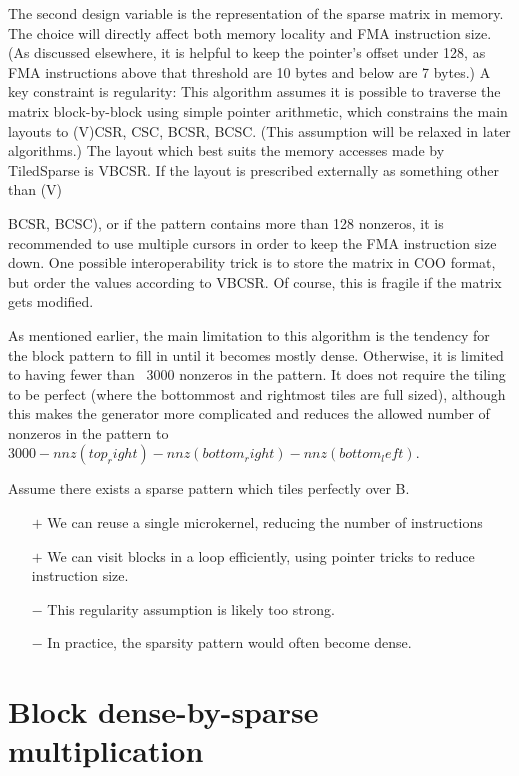 The second design variable is the representation of the sparse matrix in memory. The choice will
directly affect both memory locality and FMA instruction size. (As discussed elsewhere, it is 
helpful to keep the pointer's offset under 128, as FMA instructions above that threshold are
10 bytes and below are 7 bytes.) A key constraint is regularity: This algorithm assumes it is
possible to traverse the matrix block-by-block using simple pointer arithmetic, which constrains 
the main layouts to (V){CSR, CSC, BCSR, BCSC}. (This assumption will be relaxed in 
later algorithms.) The layout which best suits the memory accesses made by TiledSparse 
is VBCSR. If the layout is prescribed externally as something other than (V){BCSR, BCSC), 
or if the pattern contains more than 128 nonzeros, it is recommended to use multiple cursors in 
order to keep the FMA instruction size down. One possible interoperability trick is to store 
the matrix in COO format, but order the values according to VBCSR. Of course, this is fragile 
if the matrix gets modified.

As mentioned earlier, the main limitation to this algorithm is the tendency for the block pattern to 
fill in until it becomes mostly dense. Otherwise, it is limited to having fewer than ~3000 nonzeros 
in the pattern. It does not require the tiling to be perfect (where the bottommost and rightmost 
tiles are full sized), although this makes the generator more complicated and reduces the allowed 
number of nonzeros in the pattern to $3000 - nnz(top_right) - nnz(bottom_right) - nnz(bottom_left)$. 



        Assume there exists a sparse pattern which tiles perfectly over B.
        \begin{itemize}
        \item[$+$] We can reuse a single microkernel, reducing the number of instructions
        \item[$+$] We can visit blocks in a loop efficiently, using pointer tricks to reduce instruction size.
        \item[$-$] This regularity assumption is likely too strong.
        \item[$-$] In practice, the sparsity pattern would often become dense.
        \end{itemize}




\section{Block dense-by-sparse multiplication}

}
